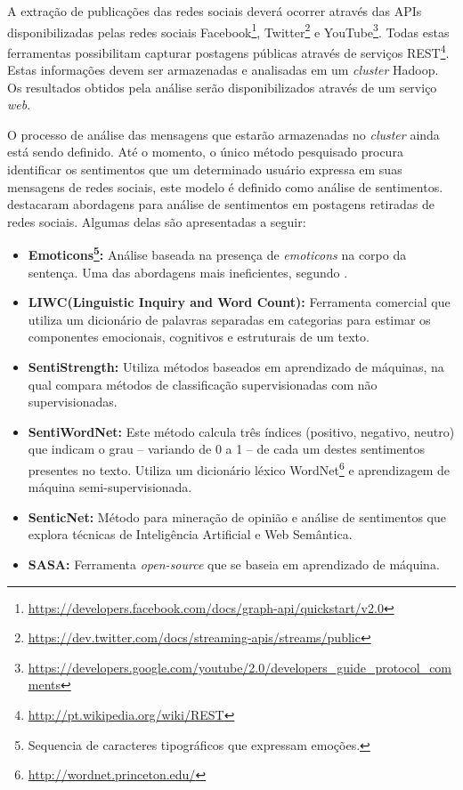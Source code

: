A extração de publicações das redes sociais deverá ocorrer através das APIs disponibilizadas pelas redes sociais Facebook\footnote{\url{https://developers.facebook.com/docs/graph-api/quickstart/v2.0}}, Twitter\footnote{\url{https://dev.twitter.com/docs/streaming-apis/streams/public}} e YouTube\footnote{\url{https://developers.google.com/youtube/2.0/developers_guide_protocol_comments}}. Todas estas ferramentas possibilitam capturar postagens públicas através de serviços REST\footnote{\url{http://pt.wikipedia.org/wiki/REST}}. Estas informações devem ser armazenadas e analisadas em um \textit{cluster} Hadoop. Os resultados obtidos pela análise serão disponibilizados através de um serviço \textit{web}.

O processo de análise das mensagens que estarão armazenadas no \textit{cluster} ainda está sendo definido. Até o momento, o único método pesquisado procura identificar os sentimentos que um determinado usuário expressa em suas mensagens de redes sociais, este modelo é definido como análise de sentimentos.  destacaram abordagens para análise de sentimentos em postagens retiradas de redes sociais. Algumas delas são apresentadas a seguir:

\begin{itemize}

  \item \textbf{Emoticons\footnote{Sequencia de caracteres tipográficos que expressam emoções.}:} Análise baseada na presença de \textit{emoticons} na corpo da sentença. Uma das abordagens mais ineficientes, segundo .
  \item \textbf{LIWC(Linguistic Inquiry and Word Count):} Ferramenta comercial que utiliza um dicionário de palavras separadas em categorias para estimar os componentes emocionais, cognitivos e estruturais de um texto.
  \item \textbf{SentiStrength:} Utiliza métodos baseados em aprendizado de máquinas, na qual compara métodos de classificação supervisionadas com não supervisionadas.
  \item \textbf{SentiWordNet:} Este método calcula três índices (positivo, negativo, neutro) que indicam o grau – variando de 0 a 1 – de cada um destes sentimentos presentes no texto. Utiliza um dicionário léxico WordNet\footnote{\url{http://wordnet.princeton.edu/}} e aprendizagem de máquina semi-supervisionada.
  \item \textbf{SenticNet:} Método para mineração de opinião e análise de sentimentos que explora técnicas de Inteligência Artificial e Web Semântica.
  \item \textbf{SASA:} Ferramenta \textit{open-source} que se baseia em aprendizado de máquina.

\end{itemize}


















